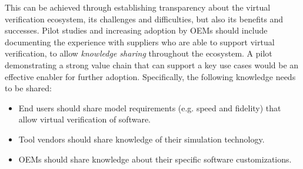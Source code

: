 This can be achieved through establishing transparency about the virtual verification ecosystem, its challenges and difficulties, but also its benefits and successes. 
Pilot studies and increasing adoption by OEMs should include documenting the experience with suppliers who are able to support virtual verification, to allow \emph{knowledge sharing} throughout the ecosystem.
A pilot demonstrating a strong value chain that can support a key use cases would be an effective enabler for further adoption.
Specifically, the following knowledge needs to be shared:
\begin{itemize}
  \item End users should share model requirements (e.g. speed and fidelity) that allow virtual verification of software.
  \item Tool vendors should share knowledge of their simulation technology.
  \item OEMs should share knowledge about their specific software customizations.
\end{itemize}